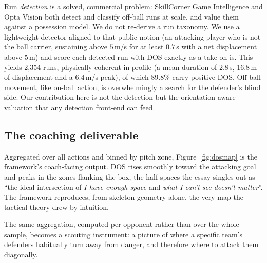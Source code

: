 \documentclass[11pt]{article}
\begin{document}
Run \emph{detection} is a solved, commercial problem: SkillCorner Game
Intelligence \citep{skillcorner2024} and Opta Vision \citep{optavision2025}
both detect and classify off-ball runs at scale, and \citet{llana2022}
value them against a possession model. We do not re-derive a run taxonomy.
We use a lightweight detector aligned to that public notion (an
attacking player who is not the ball carrier, sustaining above $5$\,m/s
for at least $0.7$\,s with a net displacement above $5$\,m) and score
each detected run with DOS exactly as a take-on is. This yields 2{,}354
runs, physically coherent in profile (a mean duration of 2.8\,s, 16.8\,m
of displacement and a 6.4\,m/s peak), of which 89.8\% carry positive DOS.
Off-ball movement, like on-ball action, is overwhelmingly a search for the
defender's blind side. Our contribution here is not the detection but the
orientation-aware valuation that any detection front-end can feed.

\subsection{The coaching deliverable}
\label{sec:res-map}

Aggregated over all actions and binned by pitch zone,
Figure~\ref{fig:dosmap} is the framework's coach-facing output. DOS rises
smoothly toward the attacking goal and peaks in the zones flanking the box,
the half-spaces the essay singles out as ``the ideal intersection of
\emph{I have enough space} and \emph{what I can't see doesn't matter}''.
The framework reproduces, from skeleton geometry alone, the very map the
tactical theory drew by intuition.

The same aggregation, computed per opponent rather than over the whole
sample, becomes a scouting instrument: a picture of where a specific
team's defenders habitually turn away from danger, and therefore where to
attack them diagonally.
\end{document}
